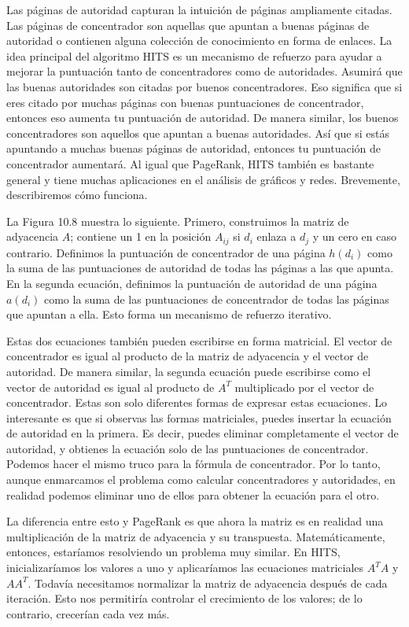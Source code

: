 Las páginas de autoridad capturan la intuición de páginas ampliamente citadas. Las páginas de concentrador son aquellas que apuntan a buenas páginas de autoridad o contienen alguna colección de conocimiento en forma de enlaces. La idea principal del algoritmo HITS es un mecanismo de refuerzo para ayudar a mejorar la puntuación tanto de concentradores como de autoridades. Asumirá que las buenas autoridades son citadas por buenos concentradores. Eso significa que si eres citado por muchas páginas con buenas puntuaciones de concentrador, entonces eso aumenta tu puntuación de autoridad. De manera similar, los buenos concentradores son aquellos que apuntan a buenas autoridades. Así que si estás apuntando a muchas buenas páginas de autoridad, entonces tu puntuación de concentrador aumentará. Al igual que PageRank, HITS también es bastante general y tiene muchas aplicaciones en el análisis de gráficos y redes. Brevemente, describiremos cómo funciona.

La Figura 10.8 muestra lo siguiente. Primero, construimos la matriz de adyacencia \(A\); contiene un 1 en la posición \(A_{ij}\) si \(d_i\) enlaza a \(d_j\) y un cero en caso contrario. Definimos la puntuación de concentrador de una página \(h(d_i)\) como la suma de las puntuaciones de autoridad de todas las páginas a las que apunta. En la segunda ecuación, definimos la puntuación de autoridad de una página \(a(d_i)\) como la suma de las puntuaciones de concentrador de todas las páginas que apuntan a ella. Esto forma un mecanismo de refuerzo iterativo.

Estas dos ecuaciones también pueden escribirse en forma matricial. El vector de concentrador es igual al producto de la matriz de adyacencia y el vector de autoridad. De manera similar, la segunda ecuación puede escribirse como el vector de autoridad es igual al producto de \(A^T\) multiplicado por el vector de concentrador. Estas son solo diferentes formas de expresar estas ecuaciones. Lo interesante es que si observas las formas matriciales, puedes insertar la ecuación de autoridad en la primera. Es decir, puedes eliminar completamente el vector de autoridad, y obtienes la ecuación solo de las puntuaciones de concentrador. Podemos hacer el mismo truco para la fórmula de concentrador. Por lo tanto, aunque enmarcamos el problema como calcular concentradores y autoridades, en realidad podemos eliminar uno de ellos para obtener la ecuación para el otro.

La diferencia entre esto y PageRank es que ahora la matriz es en realidad una multiplicación de la matriz de adyacencia y su transpuesta. Matemáticamente, entonces, estaríamos resolviendo un problema muy similar. En HITS, inicializaríamos los valores a uno y aplicaríamos las ecuaciones matriciales \(A^T A\) y \(A A^T\). Todavía necesitamos normalizar la matriz de adyacencia después de cada iteración. Esto nos permitiría controlar el crecimiento de los valores; de lo contrario, crecerían cada vez más.

